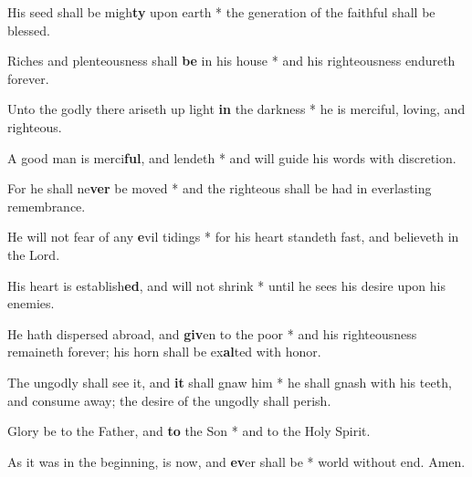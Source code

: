 \begin{multicols}{2}
	His seed shall be migh\textbf{ty} upon earth * the generation of the faithful shall be blessed.
	
	Riches and plenteousness shall \textbf{be} in his house * and his righteousness endureth forever.
	
	Unto the godly there ariseth up light \textbf{in} the darkness * he is merciful, loving, and righteous.
	
	A good man is merci\textbf{ful}, and lendeth * and will guide his words with discretion.
	
	For he shall ne\textbf{ver} be moved * and the righteous shall be had in everlasting remembrance.
	
	He will not fear of any \textbf{e}vil tidings * for his heart standeth fast, and believeth in the Lord.
	
	His heart is establish\textbf{ed}, and will not shrink * until he sees his desire upon his enemies.
	
	He hath dispersed abroad, and \textbf{giv}en to the poor * and his righteousness remaineth forever; his horn shall be ex\textbf{al}ted with honor.
	
	The ungodly shall see it, and \textbf{it} shall gnaw him * he shall gnash with his teeth, and consume away; the desire of the ungodly shall perish.
	
	Glory be to the Father, and \textbf{to} the Son * and to the Holy Spirit.
	
	As it was in the beginning, is now, and \textbf{ev}er shall be * world without end. Amen.
\end{multicols}